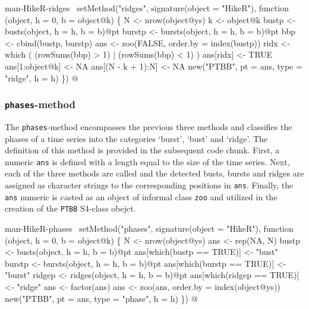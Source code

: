 \documentclass[a4paper]{article}
\begin{document}
\nwenddocs{}\endmoddef
\LA{}man-HikeR-ridges~{\nwtagstyle{}}\RA{}
setMethod("ridges",
    signature(object = "HikeR"),
    function (object, h = 0, b = object@k) \{
        N <- nrow(object@ys)
        k <- object@k
        bustp <- busts(object, h = h, b = b)@pt
        burstp <- bursts(object, h = h, b = b)@pt
        bbp <- cbind(bustp, burstp)
        ans <- zoo(FALSE, order.by = index(bustp))
        ridx <- which ( (rowSums(bbp) > 1) | (rowSums(bbp) < 1) )
        ans[ridx] <- TRUE
        ans[1:object@k] <- NA
        ans[(N - k + 1):N] <- NA
        new("PTBB", pt = ans, type = "ridge", h = h)
\})
\nwendcode{}@

\subsubsection{\texttt{phases}-method}
The \verb?phases?-method encompasses the previous three methods and
classifies the phases of a time series into the categories `burst',
`bust' and `ridge'. The definition of this method is provided in the
subsequent code chunk. First, a numeric \verb?ans? is defined with a
length equal to the size of the time series. Next, each of the three
methods are called and the detected busts, bursts and ridges are
assigned as character strings to the corresponding positions in
\verb?ans?. Finally, the \verb?ans? numeric is casted as an object of
informal class \verb?zoo? and utilized in the creation of the \verb?PTBB?
S4-class obejct.

\nwenddocs{}\endmoddef
\LA{}man-HikeR-phases~{\nwtagstyle{}}\RA{}
setMethod("phases",
    signature(object = "HikeR"),
    function (object, h = 0, b = object@k) \{
        N <- nrow(object@ys)
        ans <- rep(NA, N)
        bustp <- busts(object, h = h, b = b)@pt
        ans[which(bustp == TRUE)] <- "bust"
        burstp <- bursts(object, h = h, b = b)@pt
        ans[which(burstp == TRUE)] <- "burst"
        ridgep <- ridges(object, h = h, b = b)@pt
        ans[which(ridgep == TRUE)] <- "ridge"
        ans <- factor(ans)
        ans <- zoo(ans, order.by = index(object@ys))
        new("PTBB", pt = ans, type = "phase", h = h)
\})
\nwendcode{}@
\end{document}
